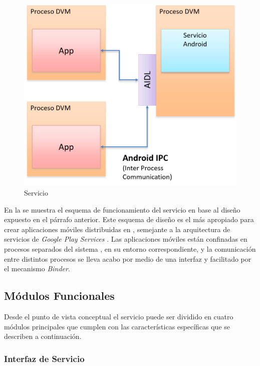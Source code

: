 \begin{figure}[H]
\begin{centering}
\includegraphics[width=0.8\columnwidth]{capitulo-5/graphics/hardroid_func}
\par\end{centering}
\caption[Servicio HARDroid]{\label{fig5:hardroid-func}Servicio }

\end{figure}

En la  se muestra el esquema de funcionamiento
del servicio  en base al diseño expuesto en el párrafo
anterior. Este esquema de diseño es el más apropiado para crear aplicaciones
móviles distribuidas en , semejante a la arquitectura
de servicios de \emph{Google Play Services} \cite{Google2016l}. Las
aplicaciones móviles están confinadas en procesos separados del sistema
, en su entorno  correspondiente, y la comunicación
entre distintos procesos se lleva acabo por medio de una interfaz
 y facilitado por el mecanismo  \emph{Binder}.

\subsection{Módulos Funcionales}

\label{ssec54:modulos}Desde el punto de vista conceptual el servicio
 puede ser dividido en cuatro módulos principales
que cumplen con las características específicas que se describen a
continuación.

\subsubsection{Interfaz de Servicio}

